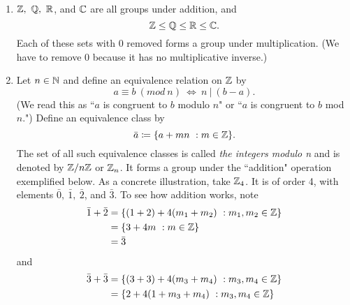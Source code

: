 \begin{example*}{}{}
\begin{enumerate}
  \item $\mathbb{Z},\ \mathbb{Q},\ \mathbb{R}$, and $\mathbb{C}$ are all groups
        under addition, and
        \begin{equation}
          \mathbb{Z} \leq \mathbb{Q} \leq \mathbb{R} \leq \mathbb{C}.
        \end{equation}
        Each of these sets with 0 removed forms a group under
        multiplication. (We have to remove 0 because it has no multiplicative
        inverse.)
  \item Let $n\in \mathbb{N}$ and define an equivalence relation on 
        $\mathbb{Z}$ by 
        \begin{equation}
          a\equiv b\ (mod\ n)\ \Leftrightarrow\ n\ |\ (b-a).
        \end{equation}
        (We read this as ``$a$ is congruent to $b$ modulo $ n$" or ``$a$ is
        congruent to $b$ mod $n$.") Define an equivalence class by 
        \begin{equation}
          \bar{a}\coloneqq\{a+mn\ : m\in \mathbb{Z}\}.
        \end{equation}
        The set of all such equivalence classes is called {\it the integers 
        modulo n} and is denoted by 
        $\mathbb{Z}/n\mathbb{Z}$ or $\mathbb{Z}_n$. It forms a group 
        under the ``addition" operation exemplified below. As a concrete 
        illustration, take $\mathbb{Z}_4$. It is of order 4, with 
        elements $\bar{0},\ \bar{1},\ \bar{2}$, and $\bar{3}$. To see how 
        addition works, note
        \begin{equation}
          \label{eq:chgtmaad1}
          \begin{aligned}
            \bar{1}+\bar{2}&=\{(1+2)+4(m_{1}+m_{2})\ : m_{1},m_{2}
                             \in \mathbb{Z}\}\\
                         &=\{3+4m\ : m\in \mathbb{Z}\}\\
                         &=\bar{3}
          \end{aligned}
        \end{equation}
        and
        \begin{equation}
          \label{eq:chgtmaad2}
          \begin{aligned}
            \bar{3}+\bar{3}&=\{(3+3)+4(m_{3}+m_{4})\ : m_{3},m_{4}
                             \in \Z\}\\
                         &=\{2+4(1+m_{3}+m_{4})\ : m_{3},m_{4}
                             \in \Z\}\\

\end{aligned}
\end{equation}
\end{enumerate}
\end{example*}
